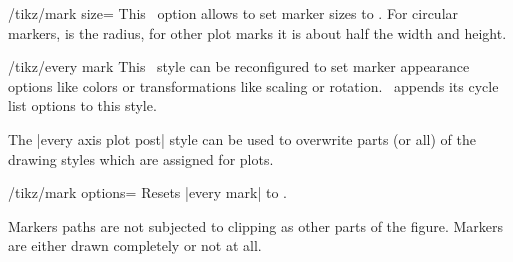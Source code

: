 \begin{key}{/tikz/mark size=}
	This \Tikz\ option allows to set marker sizes to . For circular markers,  is the radius, for other plot marks it is about half the width and height.
\end{key}
\begin{key}{/tikz/every mark}
	This \Tikz\ style can be reconfigured to set marker appearance options like colors or transformations like scaling or rotation. \PGFPlots\ appends its cycle list options to this style.
\begin{codeexample}[]
\end{codeexample}

\begin{codeexample}[]
\end{codeexample}

The |every axis plot post| style can be used to overwrite parts (or all) of the drawing styles which are assigned for plots.
\begin{codeexample}[]
\end{codeexample}
\end{key}

\begin{key}{/tikz/mark options=}
	Resets |every mark| to .
\end{key}

Markers paths are not subjected to clipping as other parts of the figure. Markers are either drawn completely or not at all.

